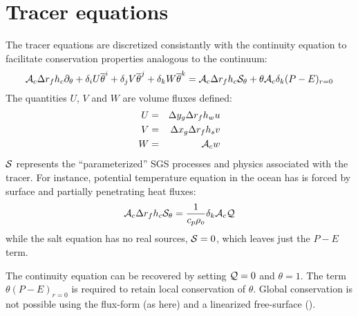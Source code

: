 
\section{Tracer equations}

The tracer equations are discretized consistantly with the continuity
equation to facilitate conservation properties analogous to the
continuum:
\begin{equation}
{\cal A}_c \Delta r_f h_c \partial_\theta
+ \delta_i U \overline{ \theta }^i
+ \delta_j V \overline{ \theta }^j
+ \delta_k W \overline{ \theta }^k
= {\cal A}_c \Delta r_f h_c {\cal S}_\theta + \theta {\cal A}_c \delta_k (P-E)_{r=0}
\end{equation}
The quantities $U$, $V$ and $W$ are volume fluxes defined:
\begin{eqnarray}
U & = & \Delta y_g \Delta r_f h_w u \\
V & = & \Delta x_g \Delta r_f h_s v \\
W & = & {\cal A}_c w
\end{eqnarray}
${\cal S}$ represents the ``parameterized'' SGS processes and
physics associated with the tracer. For instance, potential
temperature equation in the ocean has is forced by surface and
partially penetrating heat fluxes:
\begin{equation}
{\cal A}_c \Delta r_f h_c {\cal S}_\theta = \frac{1}{c_p \rho_o} \delta_k {\cal A}_c {\cal Q}
\end{equation}
while the salt equation has no real sources, ${\cal S}=0$, which
leaves just the $P-E$ term.

The continuity equation can be recovered by setting ${\cal Q}=0$ and
$\theta=1$. The term $\theta (P-E)_{r=0}$ is required to retain local
conservation of $\theta$. Global conservation is not possible using
the flux-form (as here) and a linearized free-surface
(\cite{Griffies00,Campin02}).




